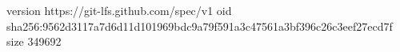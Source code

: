 version https://git-lfs.github.com/spec/v1
oid sha256:9562d3117a7d6d11d101969bdc9a79f591a3c47561a3bf396c26c3eef27ecd7f
size 349692
